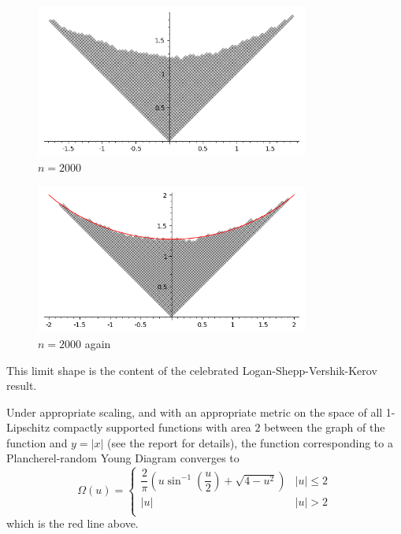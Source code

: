 \documentclass[aspectratio=169]{beamer}
\begin{document}
\begin{frame}
\begin{figure}
    \centering
    \includegraphics[width = 0.8\textwidth]{pic2000}
\caption{$n = 2000$}\end{figure}
\end{frame}


\begin{frame}
\begin{figure}
    \centering
    \includegraphics[width = 0.8\textwidth]{pic2000sur}
\caption{$n = 2000$ again}\end{figure}
\end{frame}

\begin{frame}
    This limit shape is the content of the celebrated Logan-Shepp-Vershik-Kerov result. \pause
    \begin{theorem}
        Under appropriate scaling, and with an appropriate metric on the space of all 1-Lipschitz compactly supported functions with area $2$ between the graph of the function and $y = |x|$ (see the report for details), the function corresponding to a Plancherel-random Young Diagram converges to 
    \begin{equation*}
        \Omega(u) =%
        \begin{cases}
            \dfrac{2}{\pi}\left(u \sin^{-1}\left(\dfrac{u}{2}\right) + \sqrt{4 - u^2}\right) & |u| \leq 2\\
            |u| & |u| > 2\\   
        \end{cases}
    \end{equation*}
    which is the {\color{red} red} line above.
    \end{theorem}
\end{frame}
\end{document}
